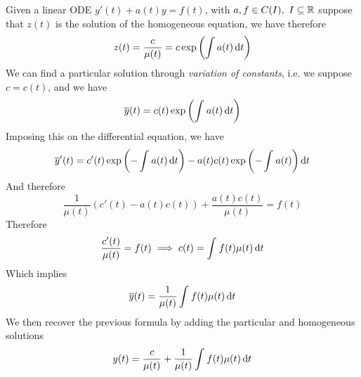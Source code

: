 \documentclass[../complete.tex]{subfiles}
\begin{document}
\begin{mtd}
	Given a linear ODE $y'(t)+a(t)y=f(t)$, with $a,f\in C(I),\ I\subseteq\mathbb{R}$ suppose that $z(t)$ is the solution of the homogeneous equation, we have therefore
	\begin{equation*}
		z(t)=\frac{c}{\mu(t)}=c\exp\left( \int a(t)\operatorname{d\!} t \right)
	\end{equation*}
	We can find a particular solution through \textit{variation of constants}, i.e. we suppose $c=c(t)$, and we have
	\begin{equation*}
		\overline{y}(t)=c(t)\exp\left( \int_{}^{}a(t)\operatorname{d\!} t \right)
	\end{equation*}
	Imposing this on the differential equation, we have
	\begin{equation*}
		\overline{y}'(t)=c'(t)\exp\left( -\int_{}^{}a(t)\operatorname{d\!} t \right)-a(t)c(t)\exp\left( -\int_{}^{}a(t) \right)\operatorname{d\!} t
	\end{equation*}
	And therefore
	\begin{equation*}
		\frac{1}{\mu(t)}\left( c'(t)-a(t)c(t) \right)+\frac{a(t)c(t)}{\mu(t)}=f(t)
	\end{equation*}
	Therefore
	\begin{equation*}
		\frac{c'(t)}{\mu(t)}=f(t)\implies c(t)=\int_{}^{}f(t)\mu(t)\operatorname{d\!} t
	\end{equation*}
	Which implies
	\begin{equation*}
		\overline{y}(t)=\frac{1}{\mu(t)}\int_{}^{}f(t)\mu(t)\operatorname{d\!} t
	\end{equation*}
	We then recover the previous formula by adding the particular and homogeneous solutions
	\begin{equation*}
		y(t)=\frac{c}{\mu(t)}+\frac{1}{\mu(t)}\int_{}^{}f(t)\mu(t)\operatorname{d\!} t
	\end{equation*}
\end{mtd}
\end{document}
